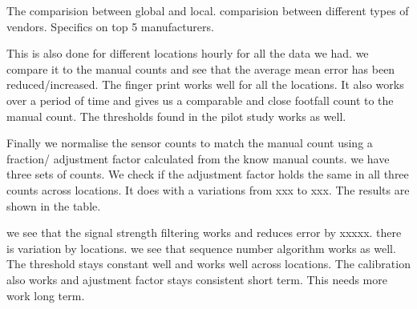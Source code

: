 The comparision between global and local.
comparision between different types of vendors.
Specifics on top 5 manufacturers.

This is also done for different locations hourly for all the data we had.
we compare it to the manual counts and see that the average mean error
has been reduced/increased. The finger print works well for all the locations.
It also works over a period of time and gives us a comparable and close 
footfall count to the manual count. The thresholds found in the pilot study
works as well.

Finally we normalise the sensor counts to match the manual count using
a fraction/ adjustment factor calculated from the know manual counts.
we have three sets of counts. We check if the adjustment factor holds the
same in all three counts across locations. It does with a variations from
xxx to xxx. The results are shown in the table. 

we see that the signal strength filtering works and reduces error by
xxxxx. there is variation by locations.
we see that sequence number algorithm works as well. The threshold stays
constant well and works well across locations. The calibration also works
and ajustment factor stays consistent short term. This needs more work 
long term.

